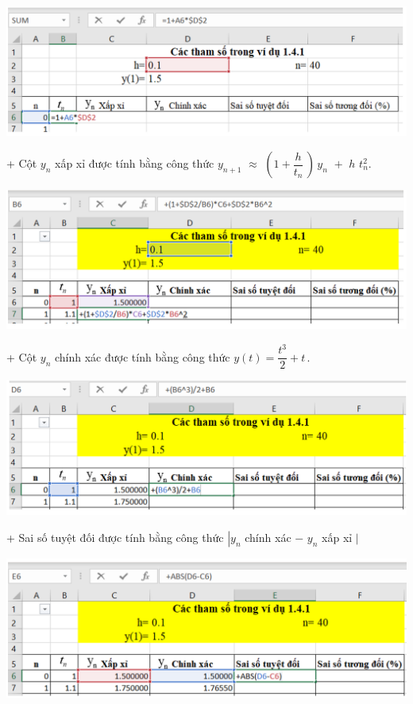 \begin{center}
	\includegraphics[scale=0.7]{Images/cac_tham_so_trong_vidu_1_4_1t}
\end{center}
+ Cột ${{y}_{n}}$ xấp xỉ được tính bằng công thức ${{y}_{n+1}}\,\,\approx \,\,(1+\dfrac{h}{{{t}_{n}}}\,)\,{{y}_{n}}\,\,+\,\,h\,\,t_{n}^{2}.$
\begin{center}
	\includegraphics[scale=0.7]{Images/cac_tham_so_trong_vidu_1_4_1tt}
\end{center}\newpage
+ Cột ${{y}_{n}}$ chính xác được tính bằng công thức $y(t)=\dfrac{{{t}^{3}}}{2}+t\,.$
\begin{center}
	\includegraphics[scale=0.7]{Images/cac_tham_so_trong_vidu_1_4_1ttt}
\end{center}
+ Sai số tuyệt đối được tính bằng công thức  $\left|y_n\right.$ chính xác $-$ $y_n$ xấp xỉ $\left.\right|$
\begin{center}
	\includegraphics[scale=0.7]{Images/cac_tham_so_trong_vidu_1_4_1tttt}
\end{center}
